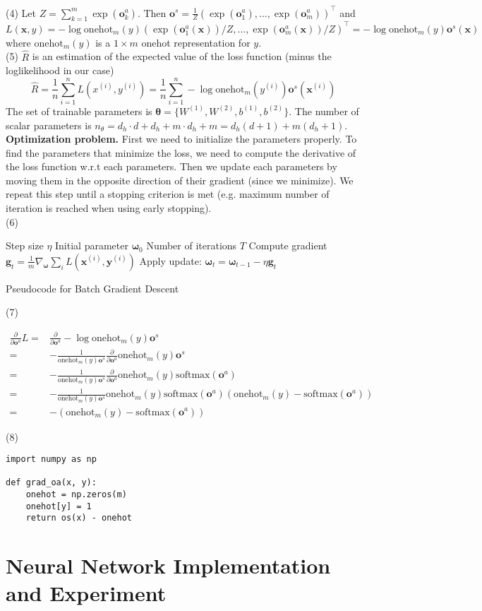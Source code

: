 \documentclass[11pt,english]{article}
\newcommand{\softmax}{\mathrm{softmax}}
\newcommand{\onehot}{\mathrm{onehot}}
\newcommand{\pd}[1]{\frac{\partial}{\partial {#1}}}
\begin{document}
(4) Let $Z=\sum_{k=1}^m \exp(\bm{o}_k^a)$. Then $\bm{o}^s=\frac{1}{Z}(\exp(\bm{o}_1^a),...,\exp(\bm{o}_m^a))^\top$ and 
\[
	L(\bm{x}, y) = -\log \onehot_m(y) (\exp(\bm{o}_1^a(\bm{x}))/Z,...,\exp(\bm{o}_m^a(\bm{x}))/Z)^\top
	= -\log \onehot_m(y)\bm{o}^s(\bm{x})
\]
where $\onehot_m(y)$ is a $1 \times  m$ onehot representation for $y$.\\
 
(5) $\hat{R}$ is an estimation of the expected value of the loss function (minus the loglikelihood in our case)
\[
	\hat{R} = \frac{1}{n}\sum_{i=1}^n L(x^{(i)}, y^{(i)})=\frac{1}{n}\sum_{i=1}^n 
	-\log \onehot_m(y^{(i)})\bm{o}^s(\bm{x}^{(i)})
\]
The set of trainable parameters is $\bm{\theta}=\{W^{(1)}, W^{(2)}, b^{(1)}, b^{(2)}\}$. The number of scalar parameters is $n_\theta=d_h\cdot d + d_h + m\cdot d_h + m=d_h(d+1)+m(d_h+1)$. \\

\textbf{Optimization problem.} First we need to initialize the parameters properly. To find the parameters that minimize the loss, we need to compute the derivative of the loss function w.r.t each parameters. Then we update each parameters by moving them in the opposite direction of their gradient (since we minimize). We repeat this step until a stopping criterion is met (e.g. maximum number of iteration is reached when using early stopping).\\

(6)
\begin{algorithm}[H]
	\begin{algorithmic}
		\REQUIRE Step size $\eta$
		\REQUIRE Initial parameter $\bm{\omega}_0$
		\REQUIRE Number of iterations $T$
		\STATE Compute gradient $\bm{g}_t=\frac{1}{m}\nabla_{\bm{\omega}}\sum_i L(\bm{x}^{(i)}, \bm{y}^{(i)})$ 
		\STATE Apply update: $\bm{\omega}_t=\bm{\omega}_{t-1}-\eta \bm{g}_t$
		\ENDFOR
	\end{algorithmic}
	\caption{Pseudocode for Batch Gradient Descent}
	\label{alg:seq}
\end{algorithm}

(7) 

\begin{equation}
\begin{split}
	\pd{\bm{o}^a}L
	=& \pd{\bm{o}^a} -\log \onehot_m(y)\bm{o}^s\\
	=& -\frac{1}{\onehot_m(y)\bm{o}^s}\pd{\bm{o}^a} \onehot_m(y)\bm{o}^s \\
	=& -\frac{1}{\onehot_m(y)\bm{o}^s}\pd{\bm{o}^a} \onehot_m(y)\softmax(\bm{o}^a) \\ 
	=& -\frac{1}{\onehot_m(y)\bm{o}^s}\onehot_m(y) \softmax(\bm{o}^a)(\onehot_m(y)-\softmax(\bm{o}^a)) \\
	=& - (\onehot_m(y)-\softmax(\bm{o}^a))
\end{split}
\end{equation}

(8) 

\begin{verbatim}
import numpy as np

def grad_oa(x, y):
    onehot = np.zeros(m)
    onehot[y] = 1
    return os(x) - onehot
\end{verbatim}

\section*{Neural Network Implementation and Experiment}
\end{document}

